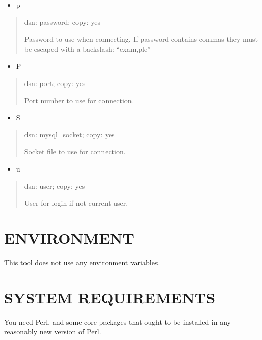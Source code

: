 \documentclass[letterpaper,10pt,english]{sphinxmanual}
\begin{document}
\begin{itemize}
\item {} 
\sphinxAtStartPar
p

\end{itemize}
\begin{quote}

\sphinxAtStartPar
dsn: password; copy: yes

\sphinxAtStartPar
Password to use when connecting.
If password contains commas they must be escaped with a backslash: “exam,ple”
\end{quote}
\begin{itemize}
\item {} 
\sphinxAtStartPar
P

\end{itemize}
\begin{quote}

\sphinxAtStartPar
dsn: port; copy: yes

\sphinxAtStartPar
Port number to use for connection.
\end{quote}
\begin{itemize}
\item {} 
\sphinxAtStartPar
S

\end{itemize}
\begin{quote}

\sphinxAtStartPar
dsn: mysql\_socket; copy: yes

\sphinxAtStartPar
Socket file to use for connection.
\end{quote}
\begin{itemize}
\item {} 
\sphinxAtStartPar
u

\end{itemize}
\begin{quote}

\sphinxAtStartPar
dsn: user; copy: yes

\sphinxAtStartPar
User for login if not current user.
\end{quote}


\section{ENVIRONMENT}
\label{\detokenize{mariadb-index-checker:environment}}
\sphinxAtStartPar
This tool does not use any environment variables.


\section{SYSTEM REQUIREMENTS}
\label{\detokenize{mariadb-index-checker:system-requirements}}
\sphinxAtStartPar
You need Perl, and some core packages that ought to be installed in any
reasonably new version of Perl.
\end{document}
